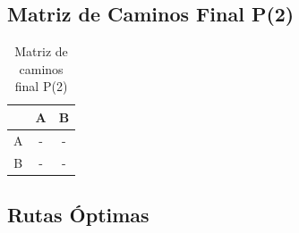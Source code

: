 \documentclass[12pt]{article}
\begin{document}
\clearpage
\subsection{Matriz de Caminos Final P(2)}
\begin{table}[h!]
\centering
\begin{tabular}{|c|c|c|}
\hline
 & A & B \\\hline
A & - & - \\\hline
B & - & - \\\hline
\end{tabular}
\caption{Matriz de caminos final P(2)}
\end{table}

\clearpage
\subsection{Rutas Óptimas}
\begin{itemize}
\end{itemize}
\end{document}
